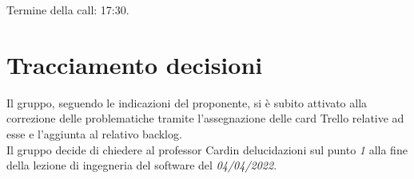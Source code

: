 \noindent Termine della call: 17:30.

\section{Tracciamento decisioni}
Il gruppo, seguendo le indicazioni del proponente, si è subito attivato alla correzione delle problematiche tramite l'assegnazione delle card Trello relative ad esse e l'aggiunta al relativo backlog.\\
Il gruppo decide di chiedere al professor Cardin delucidazioni sul punto \textit{1} alla fine della lezione di ingegneria del software del \textit{04/04/2022}.
